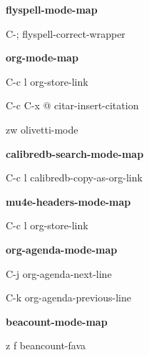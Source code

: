 \documentclass[10pt]{article}
\renewcommand\subsection[1]{\smallskip\par\textbf{\color{heading}#1}}
\begin{document}
\begin{multicols}{4}
  \subsection{flyspell-mode-map}
  \begin{keylist}
    \item[C-;] flyspell-correct-wrapper
  \end{keylist}

  \subsection{org-mode-map}
  \begin{keylist}
    \item[C-c l] org-store-link
    \item[C-c C-x @] citar-insert-citation
    \item[zw] olivetti-mode
  \end{keylist}

  \subsection{calibredb-search-mode-map}
  \begin{keylist}
    \item[C-c l] calibredb-copy-as-org-link
  \end{keylist}

  \subsection{mu4e-headers-mode-map}
  \begin{keylist}
    \item[C-c l] org-store-link
  \end{keylist}

  \subsection{org-agenda-mode-map}
  \begin{keylist}
    \item[C-j] org-agenda-next-line
    \item[C-k] org-agenda-previous-line
  \end{keylist}

  \subsection{beacount-mode-map}
  \begin{keylist}
    \item[z f] beancount-fava
  \end{keylist}



\end{multicols}
\end{document}
